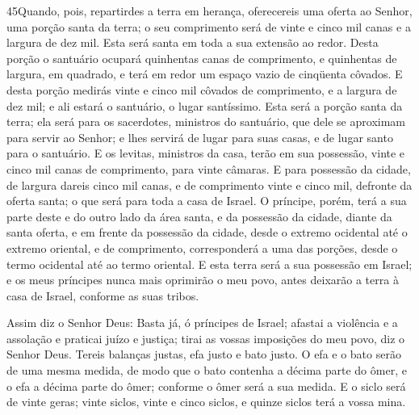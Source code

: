 \lettrine{45} Quando, pois, repartirdes a terra em herança,
oferecereis uma oferta ao Senhor, uma porção santa da terra; o seu
comprimento será de vinte e cinco mil canas e a largura de dez mil.
Esta será santa em toda a sua extensão ao redor. Desta porção o
santuário ocupará quinhentas canas de comprimento, e quinhentas de
largura, em quadrado, e terá em redor um espaço vazio de cinqüenta
côvados. E desta porção medirás vinte e cinco mil côvados de
comprimento, e a largura de dez mil; e ali estará o santuário, o
lugar santíssimo. Esta será a porção santa da terra; ela será
para os sacerdotes, ministros do santuário, que dele se aproximam
para servir ao Senhor; e lhes servirá de lugar para suas casas, e de
lugar santo para o santuário. E os levitas, ministros da casa,
terão em sua possessão, vinte e cinco mil canas de comprimento, para
vinte câmaras. E para possessão da cidade, de largura dareis
cinco mil canas, e de comprimento vinte e cinco mil, defronte da
oferta santa; o que será para toda a casa de Israel. O príncipe,
porém, terá a sua parte deste e do outro lado da área santa, e da
possessão da cidade, diante da santa oferta, e em frente da
possessão da cidade, desde o extremo ocidental até o extremo
oriental, e de comprimento, corresponderá a uma das porções, desde o
termo ocidental até ao termo oriental. E esta terra será a sua
possessão em Israel; e os meus príncipes nunca mais oprimirão o meu
povo, antes deixarão a terra à casa de Israel, conforme as suas
tribos.

Assim diz o Senhor Deus: Basta já, ó príncipes de Israel; afastai
a violência e a assolação e praticai juízo e justiça; tirai as
vossas imposições do meu povo, diz o Senhor Deus. Tereis
balanças justas, efa justo e bato justo. O efa e o bato serão
de uma mesma medida, de modo que o bato contenha a décima parte do
ômer, e o efa a décima parte do ômer; conforme o ômer será a sua
medida. E o siclo será de vinte geras; vinte siclos, vinte e
cinco siclos, e quinze siclos terá a vossa mina.

